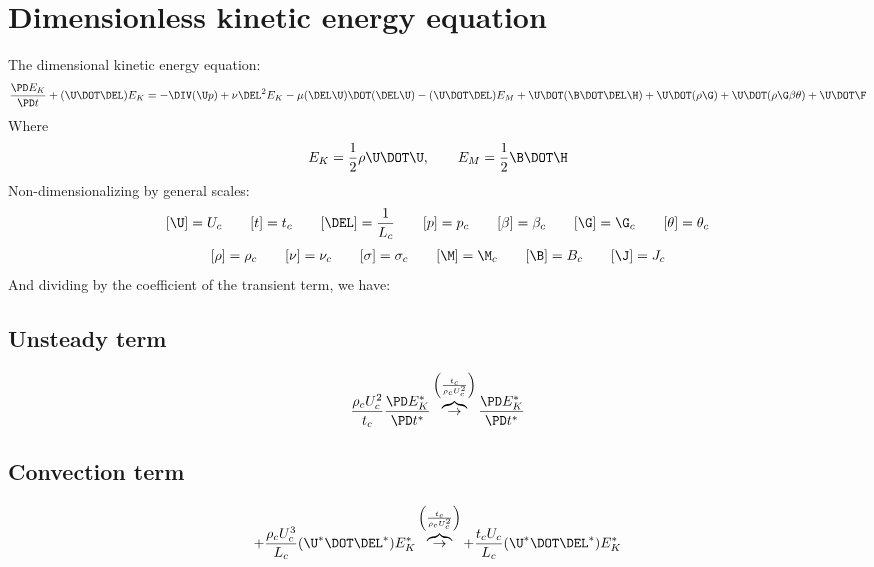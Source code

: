 \documentclass[11pt]{article}
\newcommand{\OB}{\overbrace{\rightarrow}^{\left(\frac{t_c}{\rho_c U_c^2}\right)}}
\begin{document}
\doublespacing
\MOONSTITLE
\maketitle

\section{Dimensionless kinetic energy equation}
The dimensional kinetic energy equation:
\begin{equation}
	\frac{\PD E_K}{\PD t}
	+ (\U \DOT \DEL) E_K
	=
	- \DIV (\U p)
	+ \nu \DEL^2 E_K
	- \mu (\DEL \U) \DOT (\DEL \U)
	- (\U \DOT \DEL) E_M
	+ \U \DOT (\B \DOT \DEL \H)
	+ \U \DOT (\rho \G)
	+ \U \DOT (\rho \G \beta \theta)
	+ \U \DOT \F
\end{equation}
Where
\begin{equation}
	E_K = \frac{1}{2} \rho \U \DOT \U, \qquad
	E_M = \frac{1}{2} \B \DOT \H
\end{equation}
Non-dimensionalizing by general scales:
\begin{equation}\begin{aligned}
	[\U] = U_c \qquad
	[t] = t_c \qquad
	[\DEL] = \frac{1}{L_c} \qquad
	[p] = p_c \qquad
	[\beta] = \beta_c \qquad
	[\G] = \G_c \qquad
	[\theta] = \theta_c
\end{aligned}\end{equation}
\begin{equation}\begin{aligned}
	[\rho] = \rho_c \qquad
	[\nu] = \nu_c \qquad
	[\sigma] = \sigma_c \qquad
	[\M] = \M_c \qquad
	[\B] = B_c \qquad
	[\J] = J_c
\end{aligned}\end{equation}
And dividing by the coefficient of the transient term, we have:
\subsection{Unsteady term}
\begin{equation}
	\frac{\rho_c U_c^2}{t_c} \frac{\PD E_K^*}{\PD t^*}
	\OB
	\frac{\PD E_K^*}{\PD t^*}
\end{equation}
\subsection{Convection term}
\begin{equation}
	+ \frac{\rho_c U_c^3}{L_c} (\U^* \DOT \DEL^*) E_K^*
	\OB
	+ \frac{t_c U_c}{L_c} (\U^* \DOT \DEL^*) E_K^*
\end{equation}
\end{document}

